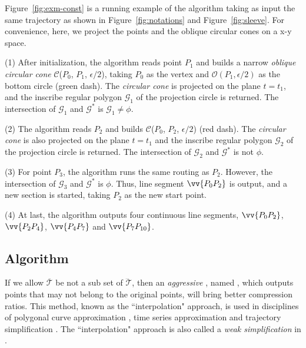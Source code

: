 \begin{example}
\label{exm-alg-conest}
Figure~\ref{fig:exm-const} is a running example of the \cist algorithm taking as input the same trajectory as shown in Figure~\ref{fig:notations} and Figure~\ref{fig:sleeve}.
For convenience, here, we project the points and the oblique circular cones on a x-y space.

\ni (1) After initialization, the \cist algorithm reads point $P_1$ and builds a narrow \emph{oblique circular cone} $\mathcal{C}$($P_0$, $P_{1}$, $\epsilon/2$), taking $P_0$ as the vertex and $\mathcal{O}(P_1, \epsilon/2)$ as the bottom circle (green dash). The \emph{circular cone} is projected on the plane $t=t_1$, and the inscribe regular polygon $\mathcal{G}_1$ of the projection circle is returned. The intersection of $\mathcal{G}_1$ and $\mathcal{G}^*$ is $\mathcal{G}_1 \ne \phi$.

\ni (2) The algorithm reads $P_2$ and builds $\mathcal{C}$($P_0$, $P_{2}$, $\epsilon/2$) (red dash). The \emph{circular cone} is also projected on the plane $t=t_1$ and the inscribe regular polygon $\mathcal{G}_2$ of the projection circle is returned. The intersection of $\mathcal{G}_2$ and $\mathcal{G}^*$ is not $\phi$.

\ni (3) For point $P_3$, the algorithm runs the same routing as $P_2$. However, the intersection of $\mathcal{G}_3$ and $\mathcal{G}^*$ is $\phi$. Thus, line segment $\vv{P_0P_2}$ is output, and a new section is started, taking $P_2$ as the new start point.

\ni (4) At last, the algorithm outputs four continuous line segments, \ie $\vv{P_0P_2}$, $\vv{P_2P_4}$, $\vv{P_4P_{7}}$ and $\vv{P_7P_{10}}$.
\end{example}






\subsection{{Algorithm \cista}}

If we allow $\overline{\mathcal{T}}$ be not a sub set of $\dddot{\mathcal{T}}$, then an \emph{aggressive} \cist, named \cista, which outputs points that may not belong to the original points, will bring better compression ratios.
This method, known as the ``interpolation" approach, is used in disciplines of polygonal curve approximation \cite{Williams:Bounded, Heckbert:Survey, Zhao:Sleeve}, time series approximation \cite{ORourke:Fitting, Elmeleegy:Stream, Xie:Stream, Luo:Streaming} and trajectory simplification \cite{Lin:Operb}. The ``interpolation" approach is also called a \emph{weak simplification} in \cite{Trajcevski:DDR}.

